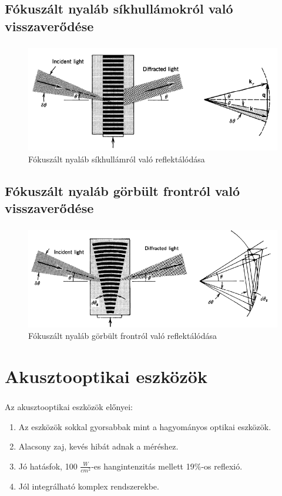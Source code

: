 \documentclass[aspectratio=169]{beamer}
\begin{document}
\subsection{Fókuszált nyaláb síkhullámokról való visszaverődése}
\begin{frame}
\frametitle{\subsecname}
\begin{figure}
\includegraphics[width=.85\textwidth]{beam-planar.png}
\caption{Fókuszált nyaláb síkhullámról való reflektálódása}
\end{figure}
\end{frame}
\subsection{Fókuszált nyaláb görbült frontról való visszaverődése}
\begin{frame}
\frametitle{\subsecname}
\begin{figure}
\includegraphics[width=.85\textwidth]{beam-spherical.png}
\caption{Fókuszált nyaláb görbült frontról való reflektálódása}
\end{figure}
\end{frame}

\section{Akusztooptikai eszközök}
\begin{frame}
\frametitle{\secname}
Az akusztooptikai eszközök előnyei:
\begin{enumerate}
\item Az eszközök sokkal gyorsabbak mint a hagyományos optikai eszközök.
\item Alacsony zaj, kevés hibát adnak a méréshez.
\item Jó hatásfok, 100 $\frac{W}{cm^2}$-es hangintenzitás mellett 19\%-os reflexió.
\item Jól integrálható komplex rendszerekbe.
\end{enumerate}
\end{frame}
\end{document}
